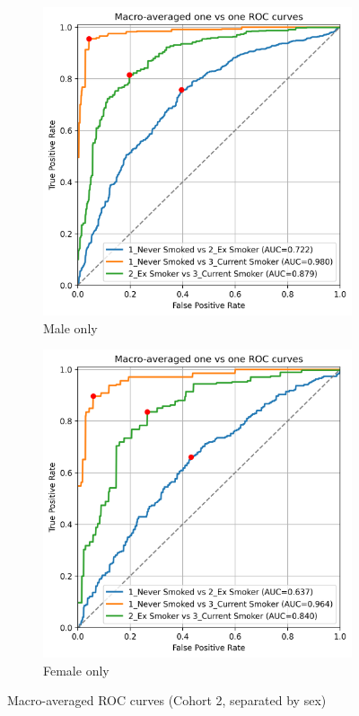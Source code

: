 \documentclass{article} %
\begin{document}
\begin{figure}[p]
    \centering
    \begin{subfigure}{0.45\linewidth}
        \centering
        \includegraphics[width=\linewidth]{cohort2/male_only/test_macro_ovo_roc.png}
        \caption{Male only}
    \end{subfigure}
    \hspace{4mm}
    \begin{subfigure}{0.45\linewidth}
        \centering
        \includegraphics[width=\linewidth]{cohort2/female_only/test_macro_ovo_roc.png}
        \caption{Female only}
    \end{subfigure}
    \caption[Macro-averaged ROC curves (Cohort 2, separated by sex)]{Macro-averaged ROC curves (Cohort 2, separated by sex)}
    \label{fig:sex-sep-macro-rocs}
\end{figure}
\end{document}
